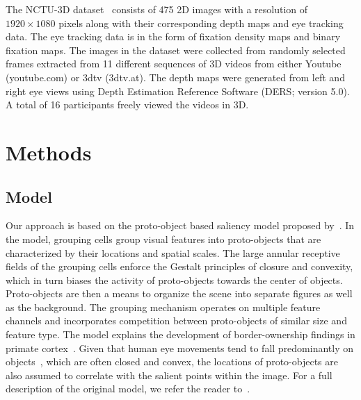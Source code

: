 The NCTU-3D dataset~\citep{Ma_Hang15} consists of 475 2D images with a resolution of $1920\times1080$ pixels along with their corresponding depth maps and eye tracking data. The eye tracking data is in the form of fixation density maps and binary fixation maps. The images in the dataset were collected from randomly selected frames extracted from 11 different sequences of 3D videos from either Youtube (youtube.com) or 3dtv (3dtv.at). The depth maps were generated from left and right eye views using Depth Estimation Reference Software (DERS; version 5.0). A total of 16 participants freely viewed the videos in 3D.

\section{Methods}

\subsection{Model}

Our approach is based on the proto-object based saliency model proposed by~\cite{Russell_etal14}. In the model, grouping cells group visual features into proto-objects that are characterized by their locations and spatial scales. The large annular receptive fields of the grouping cells enforce the Gestalt principles of closure and convexity, which in turn biases the activity of proto-objects towards the center of objects. Proto-objects are then a means to organize the scene into separate figures as well as the background. The grouping mechanism operates on multiple feature channels and incorporates competition between proto-objects of similar size and feature type. The model explains the development of border-ownership findings in primate cortex~\citep{Craft_etal07,Zhou_etal00}. Given that human eye movements tend to fall predominantly on objects~\citep[][ but see~\cite{Borji_etal13} for a different view]{Einhauser_etal08a}, which are often closed and convex, the locations of proto-objects are also assumed to correlate with the salient points within the image. For a full description of the original model, we refer the reader to~\cite{Russell_etal14}.

